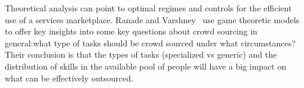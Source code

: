  Theoretical analysis can point to optimal regimes and controls for the efficient use of a services marketplace. Ranade and Varshney~\cite{glo-ranade} use game theoretic models to offer key insights into some key questions about crowd sourcing in general:what type of tasks should be crowd sourced under what circumstances? Their conclusion is that  the types of tasks (specialized vs generic) and the distribution of skills in the available pool of people will have a big impact on what can be effectively outsourced.

\label{sec:global}



